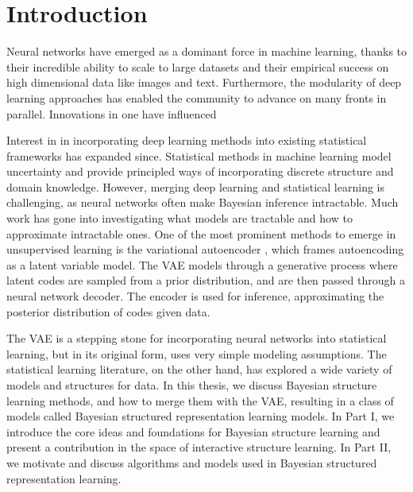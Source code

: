 \chapter{Introduction}

Neural networks have emerged
as a dominant force
in machine learning,
thanks to their
incredible
ability to scale to large datasets
and their empirical success on high dimensional
data like images and text.
Furthermore, the modularity of deep learning 
approaches has enabled the community
to advance on many fronts in parallel.
Innovations
in one  have influenced


Interest in
in incorporating deep learning
methods into existing
statistical frameworks
has expanded since.
Statistical methods in machine learning
model uncertainty and provide
principled ways of incorporating
discrete structure and 
domain knowledge.
However, merging deep learning
and statistical learning
is challenging, as neural networks
often make Bayesian inference
intractable.
Much work has gone into investigating
what models are tractable
and how to approximate
intractable ones.
One of the most prominent
methods to emerge in unsupervised learning
is the variational autoencoder \citep[VAE; ][]{Kingma2014, Rezende2014},
which frames autoencoding
as a latent variable model.
The VAE models
through a generative process
where latent codes are sampled
from a prior distribution,
and are then passed through a
neural network decoder. 
The encoder is used for inference,
approximating the posterior
distribution of codes given data.

The VAE is a stepping stone
for incorporating
neural networks into
statistical learning,
but in its original form,
uses very simple modeling assumptions.
The statistical learning literature,
on the other hand, has
explored a wide variety of
models and structures for data.
In this thesis, we discuss
Bayesian structure learning methods,
and how to merge them
with the VAE, resulting
in a class of models called
Bayesian structured representation learning
models.
In Part I, we introduce the
core ideas and foundations for Bayesian structure
learning and present a contribution
in the space of interactive structure learning.
In Part II, we motivate and discuss
algorithms and models used in Bayesian structured
representation learning.
